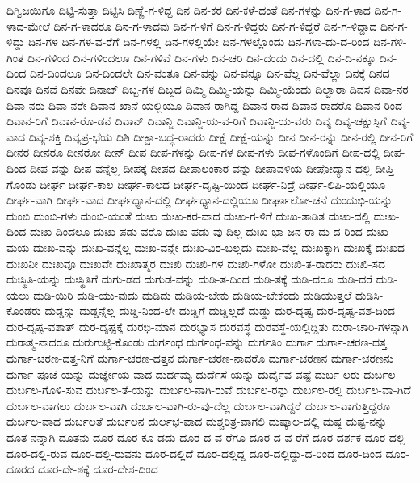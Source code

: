 {ದಿಗ್ವಿಜಯಿಗೂ
ದಿಟ್ಟಿ-ಸುತ್ತಾ
ದಿಟ್ಟಿಸಿ
ದಿಣ್ಣೆ-ಗ-ಳಿದ್ದ
ದಿನ
ದಿನ-ಕರ
ದಿನ-ಕಳೆ-ದಂತೆ
ದಿನ-ಗಳನ್ನು
ದಿನ-ಗ-ಳಾದ
ದಿನ-ಗ-ಳಾದ-ಮೇಲೆ
ದಿನ-ಗ-ಳಾದರೂ
ದಿನ-ಗ-ಳಾದವು
ದಿನ-ಗ-ಳಿಗೆ
ದಿನ-ಗ-ಳಿದ್ದರು
ದಿನ-ಗ-ಳಿದ್ದರೆ
ದಿನ-ಗ-ಳಿದ್ದಾದ
ದಿನ-ಗ-ಳಿದ್ದು
ದಿನ-ಗಳ
ದಿನ-ಗಳ-ವ-ರೆಗೆ
ದಿನ-ಗಳಲ್ಲಿ
ದಿನ-ಗಳಲ್ಲಿಯೇ
ದಿನ-ಗಳಲ್ಲೊಂದು
ದಿನ-ಗಳಾ-ದು-ದ-ರಿಂದ
ದಿನ-ಗಳಿ-ಗಿಂತ
ದಿನ-ಗಳಿಂದ
ದಿನ-ಗಳಿಂದಲೂ
ದಿನ-ಗಳಿವೆ
ದಿನ-ಗಳು
ದಿನ-ಚರಿ
ದಿನ-ದಂದು
ದಿನ-ದಲ್ಲಿ
ದಿನ-ದಿ-ನಕ್ಕೂ
ದಿನ-ದಿಂದ
ದಿನ-ದಿಂದಲೂ
ದಿನ-ದಿಂದಲೇ
ದಿನ-ವಂತೂ
ದಿನ-ವನ್ನು
ದಿನ-ವನ್ನೂ
ದಿನ-ವೆಲ್ಲ
ದಿನ-ವೆಲ್ಲಾ
ದಿನಕ್ಕೆ
ದಿನದ
ದಿನವೂ
ದಿನವೆ
ದಿನವೇ
ದಿನಾಜ್
ದಿಬ್ಬ-ಗಳ
ದಿಬ್ಬದ
ದಿಮ್ಮಿ
ದಿಮ್ಮಿ-ಯನ್ನು
ದಿಮ್ಮಿ-ಯೆಂದು
ದಿಲ್ವಾರಾ
ದಿವಸ
ದಿವಾ-ನರ
ದಿವಾ-ನರು
ದಿವಾ-ನರೇ
ದಿವಾನ-ಖಾನೆ-ಯಲ್ಲಿಯೂ
ದಿವಾನ-ರಾಗಿದ್ದ
ದಿವಾನ-ರಾದ
ದಿವಾನ-ರಾದರೊ
ದಿವಾನ-ರಿಂದ
ದಿವಾನ-ರಿಗೆ
ದಿವಾನ-ರೊ-ಡನೆ
ದಿವಾನ್
ದಿವಾನ್ಜಿ
ದಿವಾನ್ಜಿ-ಯ-ವ-ರಿಗೆ
ದಿವಾನ್ಜಿ-ಯ-ವರು
ದಿವ್ಯ
ದಿವ್ಯ-ಚಕ್ಷುಸ್ಸಿಗೆ
ದಿವ್ಯ-ವಾದ
ದಿವ್ಯ-ಶಕ್ತಿ
ದಿವ್ಯಪ್ರ-ಭೆಯ
ದಿಶಿ
ದೀಕ್ಷಾ-ಬದ್ಧ-ರಾದರು
ದೀಕ್ಷೆ
ದೀಕ್ಷೆ-ಯನ್ನು
ದೀನ
ದೀನ-ರನ್ನು
ದೀನ-ರಲ್ಲಿ
ದೀನ-ರಿಗೆ
ದೀನರ
ದೀನರೂ
ದೀನರೋ
ದೀನ್
ದೀಪ
ದೀಪ-ಗಳನ್ನು
ದೀಪ-ಗಳ
ದೀಪ-ಗಳು
ದೀಪ-ಗಳೊಂದಿಗೆ
ದೀಪ-ದಲ್ಲಿ
ದೀಪ-ದಿಂದ
ದೀಪ-ವನ್ನು
ದೀಪ-ವನ್ನೆಲ್ಲ
ದೀಪಕ್ಕೆ
ದೀಪದ
ದೀಪಾಲಂಕಾರ-ವನ್ನು
ದೀಪಾವಳಿಯ
ದೀಪೋದ್ಯಾನ-ದಲ್ಲಿ
ದೀಪ್ತಿ-ಗೊಂಡು
ದೀರ್ಘ
ದೀರ್ಘ-ಕಾಲ
ದೀರ್ಘ-ಕಾಲದ
ದೀರ್ಘ-ದೃಷ್ಟಿ-ಯಿಂದ
ದೀರ್ಘ-ನಿದ್ರೆ
ದೀರ್ಘ-ಲಿಪಿ-ಯಲ್ಲಿಯೂ
ದೀರ್ಘ-ವಾಗಿ
ದೀರ್ಘ-ವಾದ
ದೀರ್ಘಧ್ಯಾನ-ದಲ್ಲಿ
ದೀರ್ಘಧ್ಯಾನ-ದಲ್ಲಿಯೂ
ದೀರ್ಘಾಲೋ-ಚನೆ
ದುಂದುಭಿ-ಯನ್ನು
ದುಂಬಿ
ದುಂಬಿ-ಗಳು
ದುಂಬಿ-ಯಂತೆ
ದುಃಖ
ದುಃಖ-ಕರ-ವಾದ
ದುಃಖ-ಗ-ಳಿಗೆ
ದುಃಖ-ತಾಡಿತ
ದುಃಖ-ದಲ್ಲಿ
ದುಃಖ-ದಿಂದ
ದುಃಖ-ದಿಂದಲೂ
ದುಃಖ-ಪಡು-ವರೊ
ದುಃಖ-ಪಡು-ವು-ದಿಲ್ಲ
ದುಃಖ-ಭಾ-ಜನ-ರಾ-ದು-ದ-ರಿಂದ
ದುಃಖ-ಮಯ
ದುಃಖ-ವನ್ನು
ದುಃಖ-ವನ್ನೆಲ್ಲ
ದುಃಖ-ವನ್ನೇ
ದುಃಖ-ವಿರ-ಬಲ್ಲದು
ದುಃಖ-ವೆಲ್ಲ
ದುಃಖಕ್ಕಾಗಿ
ದುಃಖಕ್ಕೆ
ದುಃಖದ
ದುಃಖನೀ
ದುಃಖವೂ
ದುಃಖವೇ
ದುಃಖಾತ್ಮರ
ದುಃಖಿ
ದುಃಖಿ-ಗಳ
ದುಃಖಿ-ಗಳೋ
ದುಃಖಿ-ತ-ರಾದರು
ದುಃಖಿ-ಸದ
ದುಃಸ್ಥಿತಿ-ಯನ್ನು
ದುಃಸ್ಥಿತಿಗೆ
ದುಗು-ಡದ
ದುಗುಡ-ವನ್ನು
ದುಡಿ-ತ-ದಿಂದ
ದುಡಿ-ತಕ್ಕೆ
ದುಡಿ-ದರೂ
ದುಡಿ-ದರೆ
ದುಡಿ-ಯಲು
ದುಡಿ-ಯಿರಿ
ದುಡಿ-ಯು-ವುದು
ದುಡಿದು
ದುಡಿಯ-ಬೇಕು
ದುಡಿಯ-ಬೇಕೆಂದು
ದುಡಿಯುತ್ತಲೆ
ದುಡಿಸಿ-ಕೊಂಡರು
ದುಡ್ಡನ್ನು
ದುಡ್ಡನ್ನೆಲ್ಲ
ದುಡ್ಡಿ-ನಿಂದ-ಲೇ
ದುಡ್ಡಿಗೆ
ದುಡ್ಡಿಲ್ಲದೆ
ದುಡ್ಡು
ದುರ-ದೃಷ್ಟ
ದುರ-ದೃಷ್ಟ-ವಶ-ದಿಂದ
ದುರ-ದೃಷ್ಟ-ವಶಾತ್
ದುರ-ದೃಷ್ಟಕ್ಕೆ
ದುರಭಿ-ಮಾನ
ದುರಭ್ಯಾಸ
ದುರವಸ್ಥೆ
ದುರವಸ್ಥೆ-ಯಲ್ಲಿದ್ದಿತು
ದುರಾ-ಚಾರಿ-ಗಳನ್ನಾಗಿ
ದುರಾತ್ಮ-ನಾದರೂ
ದುರುಗುಟ್ಟಿ-ಕೊಂಡು
ದುರ್ಗಂಧ
ದುರ್ಗಂಧ-ವನ್ನು
ದುರ್ಗತಿಂ
ದುರ್ಗಾ
ದುರ್ಗಾ-ಚರಣ-ದತ್ತ
ದುರ್ಗಾ-ಚರಣ-ದತ್ತ-ನಿಗೆ
ದುರ್ಗಾ-ಚರಣ-ದತ್ತನ
ದುರ್ಗಾ-ಚರಣ-ನಾದರೊ
ದುರ್ಗಾ-ಚರಣನ
ದುರ್ಗಾ-ಚರಣನು
ದುರ್ಗಾ-ಪೂಜೆ-ಯನ್ನು
ದುರ್ಜ್ಞೇಯ-ವಾದ
ದುರ್ದಮ್ಯ
ದುರ್ದೆಸೆ-ಯನ್ನು
ದುರ್ದೈವ-ವಷ್ಟೆ
ದುರ್ಬ-ಲರು
ದುರ್ಬಲ
ದುರ್ಬಲ-ಗೊಳಿ-ಸುವ
ದುರ್ಬಲ-ತೆ-ಯನ್ನು
ದುರ್ಬಲ-ನಾಗಿ-ರುವೆ
ದುರ್ಬಲ-ರನ್ನು
ದುರ್ಬಲ-ರಲ್ಲಿ
ದುರ್ಬಲ-ವಾ-ಗಿದೆ
ದುರ್ಬಲ-ವಾಗಲು
ದುರ್ಬಲ-ವಾಗಿ
ದುರ್ಬಲ-ವಾಗಿ-ರು-ವು-ದೆಲ್ಲ
ದುರ್ಬಲ-ವಾಗಿದ್ದರೆ
ದುರ್ಬಲ-ವಾಗುತ್ತಿದ್ದರೂ
ದುರ್ಬಲ-ವಾದ
ದುರ್ಬಲತೆ
ದುರ್ಬಲನ
ದುರ್ಲಭ-ವಾದ
ದುಶ್ಚರಿತ್ರ-ವಾಗಲಿ
ದುಷ್ಕಾಲ-ದಲ್ಲಿ
ದುಷ್ಟ
ದುಷ್ಟ-ನನ್ನು
ದೂತ-ನನ್ನಾಗಿ
ದೂತನು
ದೂರ
ದೂರ-ಕೂ-ಡದು
ದೂರ-ದ-ವ-ರೆಗೂ
ದೂರ-ದ-ವ-ರೆಗೆ
ದೂರ-ದರ್ಶಕ
ದೂರ-ದಲ್ಲಿ
ದೂರ-ದಲ್ಲಿ-ರುವ
ದೂರ-ದಲ್ಲಿ-ರುವನು
ದೂರ-ದಲ್ಲಿದೆ
ದೂರ-ದಲ್ಲಿದ್ದ
ದೂರ-ದಲ್ಲಿದ್ದು-ದ-ರಿಂದ
ದೂರ-ದಿಂದ
ದೂರ-ದೂರದ
ದೂರ-ದೇ-ಶಕ್ಕೆ
ದೂರ-ದೇಶ-ದಿಂದ
}
